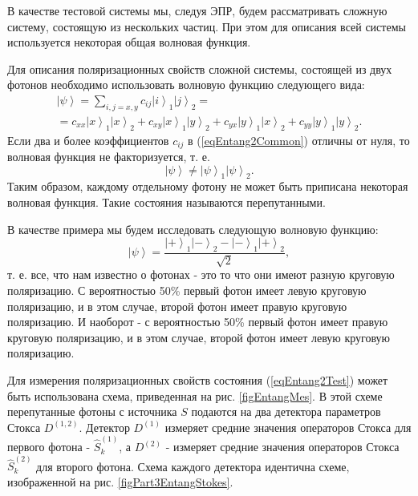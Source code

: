 В качестве тестовой системы мы, следуя ЭПР, будем рассматривать сложную
систему, состоящую из нескольких частиц. При этом для описания всей
системы используется некоторая общая волновая функция.

Для описания поляризационных свойств сложной системы, состоящей из двух
фотонов необходимо использовать волновую функцию следующего вида:
\begin{eqnarray}
\left|\psi\right> = \sum_{i,j = x,y} 
c_{ij}\left|i\right>_1\left|j\right>_2 = 
\nonumber \\
= c_{xx} \left|x\right>_1\left|x\right>_2 +
c_{xy} \left|x\right>_1\left|y\right>_2 +
c_{yx} \left|y\right>_1\left|x\right>_2 +
c_{yy} \left|y\right>_1\left|y\right>_2.
\label{eqEntang2Common}
\end{eqnarray}
Если два и более коэффициентов $c_{ij}$ в (\ref{eqEntang2Common})
отличны от нуля, то волновая функция не факторизуется, т. е. 
\[
\left|\psi\right> \ne \left|\psi\right>_1 \left|\psi\right>_2.
\]
Таким образом, каждому отдельному фотону не может быть приписана
некоторая волновая функция. Такие состояния называются перепутанными.

В качестве примера мы будем исследовать следующую волновую функцию:
\begin{equation}
  \left|\psi\right> = \frac{
    \left| + \right>_1\left| - \right>_2 -
    \left| - \right>_1\left| + \right>_2
  }{\sqrt{2}},
\label{eqEntang2Test}
\end{equation}
т. е. все, что нам известно о фотонах - это то что они имеют разную
круговую поляризацию. С вероятностью 50\% первый фотон имеет левую
круговую поляризацию, и в этом случае, второй фотон имеет правую
круговую поляризацию. И наоборот -  с вероятностью 50\% первый фотон
имеет правую круговую поляризацию, и в этом случае, второй фотон имеет
левую круговую поляризацию. 



Для измерения поляризационных свойств состояния (\ref{eqEntang2Test})
может быть использована схема, приведенная на рис. \ref{figEntangMes}. 
В этой схеме перепутанные фотоны с источника $S$ подаются на два детектора
параметров Стокса $D^{(1,2)}$. Детектор $D^{(1)}$ измеряет средние
значения операторов Стокса для первого фотона - $\hat{S}_k^{(1)}$, а
$D^{(2)}$ - измеряет средние значения операторов Стокса
$\hat{S}_k^{(2)}$ для второго фотона. Схема каждого детектора
идентична схеме, изображенной на рис. \ref{figPart3EntangStokes}.

